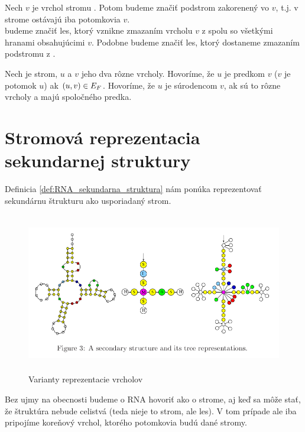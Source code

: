 Nech $v$ je vrchol stromu . Potom  budeme značiť podstrom  zakorenený vo $v$,
t.j. v strome ostávajú iba potomkovia $v$.
\\
 budeme značiť les, ktorý vznikne zmazaním vrcholu $v$ z  spolu so
všetkými hranami obsahujúcimi $v$. Podobne  budeme značiť les, ktorý
dostaneme zmazaním podstromu  z .

\begin{definice}
  Nech  je strom, $u$ a $v$ jeho dva rôzne vrcholy.
  Hovoríme, že $u$ je predkom $v$ ($v$ je potomok $u$) ak $(u, v) \in E_{F}$.
  Hovoríme, že $u$ je súrodencom $v$, ak sú to rôzne vrcholy a majú spoločného predka.
\end{definice}



\section{Stromová reprezentacia sekundarnej struktury}

Definicia \ref{def:RNA_sekundarna_struktura} nám ponúka reprezentovať sekundárnu štrukturu
ako usporiadaný strom.

\begin{figure}[H]
\centering
\includegraphics[width=130mm, height=70mm]{../img/stromova_reprezentacia_rna.png}
\caption{Varianty reprezentacie vrcholov}
\label{obr:RNA_vrcholy}
\end{figure}

Bez ujmy na obecnosti budeme o RNA hovoriť ako o strome, aj keď sa môže stať, že
štruktúra nebude celistvá (teda nieje to strom, ale les). V tom prípade ale
iba pripojíme koreňový vrchol, ktorého potomkovia budú dané stromy.

